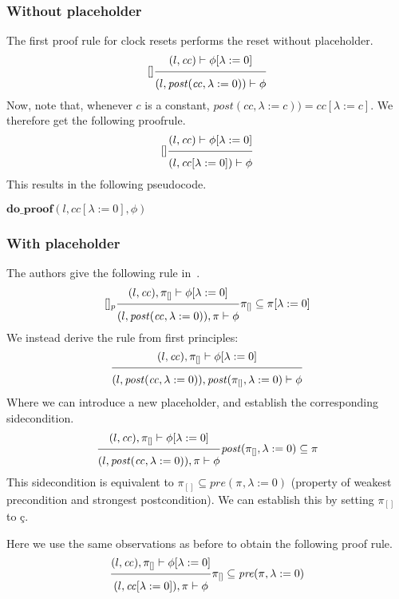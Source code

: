 \documentclass{article}
\newcommand{\proofrule}[3][]{#1 \frac{\raisebox{.7ex}{\normalsize{$#2$}}}
  {\raisebox{-1.0ex}{\normalsize{$#3$}}}}
\newcommand{\placeholder}[1][]{\pi_{#1}}
\newcommand{\loc}{l}
\newcommand{\region}{\mathit{cc}}
\newcommand{\post}{\mathit{post}}
\newcommand{\method}[1]{\ensuremath{\mathbf{#1}}}
\begin{document}
\subsubsection{Without placeholder}
The first proof rule for clock resets performs the reset without placeholder.
\[
\proofrule[{[]}]
{(\loc, \region) \vdash \phi[\lambda := 0]}
{(\loc, \post(\region, \lambda := 0)) \vdash \phi}
\]
Now, note that, whenever $c$ is a constant, $\post(\region, \lambda := c)) = \region[\lambda := c]$. We therefore get the following proofrule.
\[
  \proofrule[{[]}]
  {(\loc, \region) \vdash \phi[\lambda := 0]}
  {(\loc, \region[\lambda := 0]) \vdash \phi}
\]
%
This results in the following pseudocode.
\begin{algorithm}[H]
  \caption{$\method{do\_proof\_reset}(\loc, \region, \phi[\lambda := 0]$}
  \begin{algorithmic}
  \RETURN $\method{do\_proof}(\loc, \region[\lambda := 0], \phi)$
  \end{algorithmic}
  \end{algorithm}

\subsubsection{With placeholder}

The authors give the following rule in~\cite{FC:14report}.
\[
\proofrule[{[]_p}]
{(\loc, \region), \placeholder[{[]}] \vdash \phi[\lambda := 0]}
{(\loc, \post(\region, \lambda := 0)), \placeholder \vdash \phi}
\placeholder[{[]}] \subseteq \placeholder[][\lambda := 0]
\]
We instead derive the rule from first principles:
\[
\proofrule
{(\loc, \region), \placeholder[{[]}] \vdash \phi[\lambda := 0]}
{(\loc, \post(\region, \lambda := 0)), \post(\placeholder[{[]}], \lambda := 0)\vdash \phi}
\]
Where we can introduce a new placeholder, and establish the corresponding sidecondition.
\[
\proofrule
{(\loc, \region), \placeholder[{[]}] \vdash \phi[\lambda := 0]}
{(\loc, \post(\region, \lambda := 0)), \placeholder \vdash \phi}
\post(\placeholder[{[]}], \lambda := 0) \subseteq \placeholder
\]
This sidecondition is equivalent to $\placeholder[{[]}] \subseteq \mathit{pre}(\placeholder, \lambda := 0)$ (property of weakest precondition and strongest postcondition). We can establish this by setting  $\placeholder[{[]}]$ to $ç$.

Here we use the same observations as before to obtain the following proof rule.
\[
\proofrule
{(\loc, \region), \placeholder[{[]}] \vdash \phi[\lambda := 0]}
{(\loc, \region[\lambda := 0]), \placeholder \vdash \phi}
\placeholder[{[]}] \subseteq \mathit{pre}(\placeholder, \lambda := 0)
\]
\end{document}
